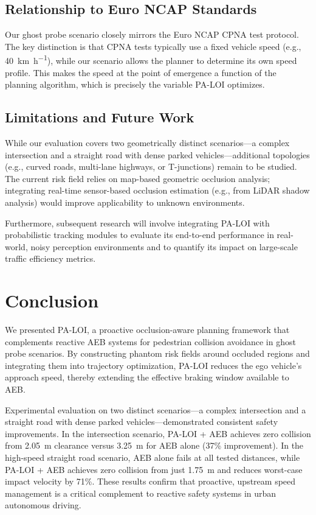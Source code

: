 \documentclass[conference]{IEEEtran}
\begin{document}
\subsection{Relationship to Euro NCAP Standards}
Our ghost probe scenario closely mirrors the Euro NCAP CPNA test protocol. The key distinction is that CPNA tests typically use a fixed vehicle speed (e.g., \SI{40}{\kilo\meter\per\hour}), while our scenario allows the planner to determine its own speed profile. This makes the speed at the point of emergence a function of the planning algorithm, which is precisely the variable PA-LOI optimizes.

\subsection{Limitations and Future Work}
While our evaluation covers two geometrically distinct scenarios---a complex intersection and a straight road with dense parked vehicles---additional topologies (e.g., curved roads, multi-lane highways, or T-junctions) remain to be studied. The current risk field relies on map-based geometric occlusion analysis; integrating real-time sensor-based occlusion estimation (e.g., from LiDAR shadow analysis) would improve applicability to unknown environments.

Furthermore, subsequent research will involve integrating PA-LOI with probabilistic tracking modules to evaluate its end-to-end performance in real-world, noisy perception environments and to quantify its impact on large-scale traffic efficiency metrics.

\section{Conclusion}

We presented PA-LOI, a proactive occlusion-aware planning framework that complements reactive AEB systems for pedestrian collision avoidance in ghost probe scenarios. By constructing phantom risk fields around occluded regions and integrating them into trajectory optimization, PA-LOI reduces the ego vehicle's approach speed, thereby extending the effective braking window available to AEB.

Experimental evaluation on two distinct scenarios---a complex intersection and a straight road with dense parked vehicles---demonstrated consistent safety improvements. In the intersection scenario, PA-LOI + AEB achieves zero collision from \SI{2.05}{\meter} clearance versus \SI{3.25}{\meter} for AEB alone (37\% improvement). In the high-speed straight road scenario, AEB alone fails at all tested distances, while PA-LOI + AEB achieves zero collision from just \SI{1.75}{\meter} and reduces worst-case impact velocity by 71\%. These results confirm that proactive, upstream speed management is a critical complement to reactive safety systems in urban autonomous driving.
\end{document}

